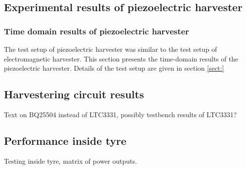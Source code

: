 \subsection{Experimental results of piezoelectric harvester}

\subsubsection{Time domain results of piezoelectric harvester}
The test setup of piezoelectric harvester was similar to the test setup of electromagnetic harvester. This section presents the time-domain results of the piezoelectric harvester. Details of the test setup are given in section \ref{sect:}

\subsection{Harvestering circuit results }
Text on BQ25504 instead of LTC3331, possibly testbench results of LTC3331?

\subsection{Performance inside tyre}
Testing inside tyre, matrix of power outputs. 

